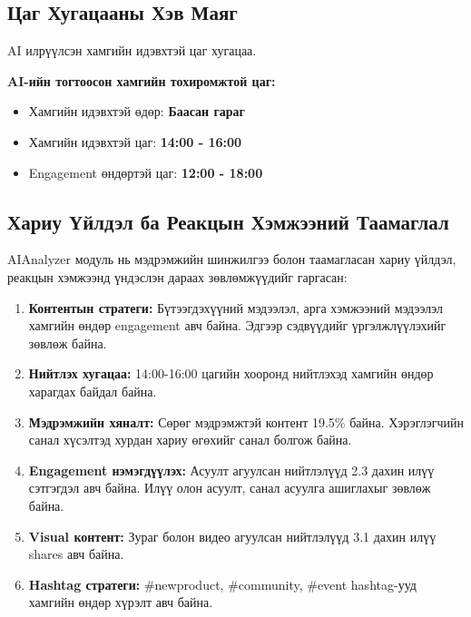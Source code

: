 \documentclass[12pt,a4paper]{report}
\begin{document}
\subsection{Цаг Хугацааны Хэв Маяг}

AI илрүүлсэн хамгийн идэвхтэй цаг хугацаа.

\textbf{AI-ийн тогтоосон хамгийн тохиромжтой цаг:}
\begin{itemize}
    \item Хамгийн идэвхтэй өдөр: \textbf{Баасан гараг}
    \item Хамгийн идэвхтэй цаг: \textbf{14:00 - 16:00}
    \item Engagement өндөртэй цаг: \textbf{12:00 - 18:00}
\end{itemize}

\subsection{Хариу Үйлдэл ба Реакцын Хэмжээний Таамаглал}

AIAnalyzer модуль нь мэдрэмжийн шинжилгээ болон таамагласан хариу үйлдэл, реакцын хэмжээнд үндэслэн дараах зөвлөмжүүдийг гаргасан:

\begin{enumerate}
    \item \textbf{Контентын стратеги:} Бүтээгдэхүүний мэдээлэл, арга хэмжээний мэдээлэл хамгийн өндөр engagement авч байна. Эдгээр сэдвүүдийг үргэлжлүүлэхийг зөвлөж байна.
    
    \item \textbf{Нийтлэх хугацаа:} 14:00-16:00 цагийн хооронд нийтлэхэд хамгийн өндөр харагдах байдал байна.
    
    \item \textbf{Мэдрэмжийн хяналт:} Сөрөг мэдрэмжтэй контент 19.5\% байна. Хэрэглэгчийн санал хүсэлтэд хурдан хариу өгөхийг санал болгож байна.
    
    \item \textbf{Engagement нэмэгдүүлэх:} Асуулт агуулсан нийтлэлүүд 2.3 дахин илүү сэтгэгдэл авч байна. Илүү олон асуулт, санал асуулга ашиглахыг зөвлөж байна.
    
    \item \textbf{Visual контент:} Зураг болон видео агуулсан нийтлэлүүд 3.1 дахин илүү shares авч байна.
    
    \item \textbf{Hashtag стратеги:} \#newproduct, \#community, \#event hashtag-ууд хамгийн өндөр хүрэлт авч байна.
\end{enumerate}
\end{document}
